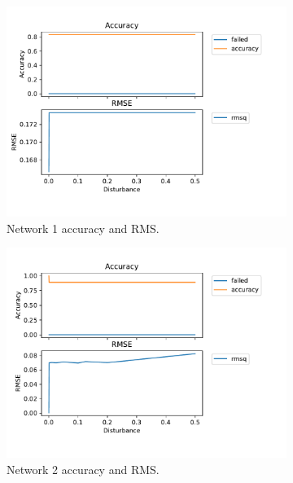 \begin{enumerate}
\begin{figure}[htbp]
\begin{subfigure}{.5\textwidth}
\centering
\includegraphics[width=0.9\linewidth]{../experiments/VlekNetwork/plots/performance_KB1.pdf}
\caption{Network 1 accuracy and RMS.}
\label{kb2a1}
\end{subfigure}%
\begin{subfigure}{.5\textwidth}
 \centering
\includegraphics[width=0.9\linewidth]{../experiments/VlekNetwork/plots/performance_KB2.pdf}
\caption{Network 2 accuracy and RMS.}
\label{kb2p}
\end{subfigure}
\begin{subfigure}{.5\textwidth}
\centering

\end{subfigure}
\end{figure}
\end{enumerate}
